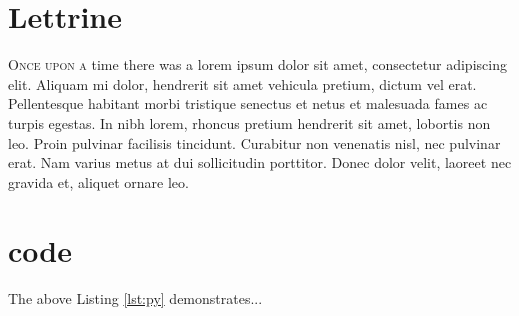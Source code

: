 \section{Lettrine}
\lettrine{O}{\fontsize{14}\fscshape{}\selectfont{}nce upon a} time there was a lorem ipsum dolor sit amet, consectetur adipiscing elit. Aliquam mi dolor, hendrerit sit amet vehicula pretium, dictum vel erat. Pellentesque habitant morbi tristique senectus et netus et malesuada fames ac turpis egestas. In nibh lorem, rhoncus pretium hendrerit sit amet, lobortis non leo. Proin pulvinar facilisis tincidunt. Curabitur non venenatis nisl, nec pulvinar erat. Nam varius metus at dui sollicitudin porttitor. Donec dolor velit, laoreet nec gravida et, aliquet ornare leo. 


\section{code}



The above Listing \ref{lst:py} demonstrates...